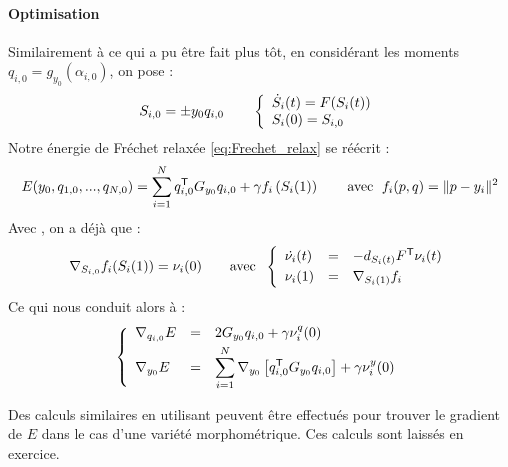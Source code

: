 \paragraph{Optimisation}
Similairement à ce qui a pu être fait plus tôt, en considérant les moments $q_{i,0} = g_{y_0}(\alpha_{i,0})$, on pose :
\begin{equation}
	S_{i,0} = \pm{y_0 \\ q_{i,0}} \qquad \syst{lll}{
		\dot{S}_i(t) = F(S_i(t)) \\
		S_i(0) = S_{i,0}
	}
\end{equation}
Notre énergie de Fréchet relaxée \eqref{eq:Frechet_relax} se réécrit :
\begin{equation}
	\label{eq:Frechet_relaxS}
	E(y_0, q_{1,0}, ..., q_{N,0}) =  \sum_{i=1}^N q_{i,0}^\trans G_{y_0} q_{i,0} + \gamma f_i \left( S_i(1) \right) \qquad \text{avec } \; f_i(p, q) = \| p - y_i \|^2
\end{equation}
Avec , on a déjà que :
\begin{equation}
	\nabla_{S_{i,0}} f_i(S_i(1)) = \nu_i(0) \qquad \text{avec } \; \syst{lll}{
		\dot{\nu_i}(t) & = & - d_{S_i(t)} F^\trans \nu_i(t) \\[1mm]
		\nu_i(1) & = & \nabla_{S_i(1)} f_i
	}
\end{equation}
Ce qui nous conduit alors à :
\begin{equation}
	\syst{lll}{
		\nabla_{q_{i,0}} E & = & \displaystyle 2 G_{y_0} q_{i,0} + \gamma \nu_i^q(0) \\[1mm]
		\nabla_{y_0} E & = & \displaystyle \sum_{i=1}^N \nabla_{y_0} \left[ q_{i,0}^\trans G_{y_0} q_{i,0} \right] + \gamma \nu_i^y(0)
	}
\end{equation}

\begin{remarque}
	Des calculs similaires en utilisant  peuvent être effectués pour trouver le gradient de $E$ dans le cas d'une variété morphométrique. Ces calculs sont laissés en exercice.
\end{remarque}


